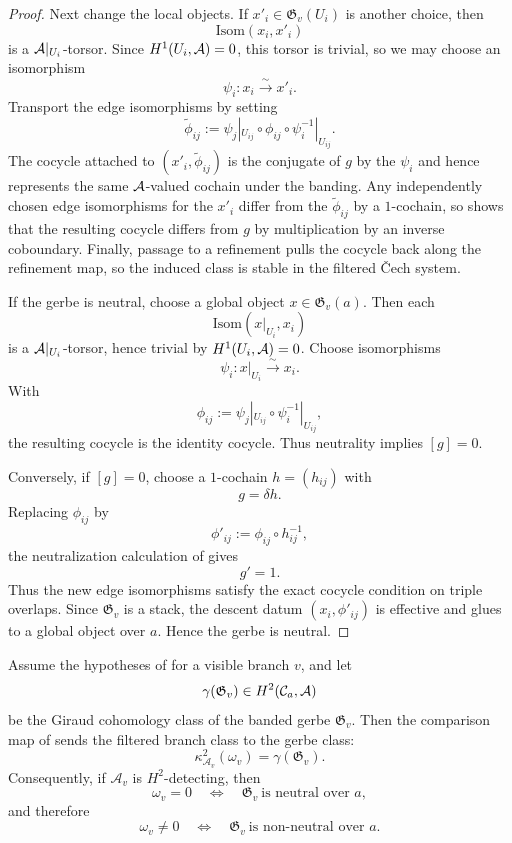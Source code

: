 \begin{proof}
Next change the local objects. If $x'_i\in \mathfrak G_v(U_i)$ is another choice, then
\[
\mathrm{Isom}(x_i,x'_i)
\]
is a $\mathcal{A}|_{U_i}$-torsor. Since $H^1(U_i,\mathcal{A})=0$, this torsor is trivial, so we may choose an isomorphism
\[
\psi_i:x_i\xrightarrow{\sim} x'_i.
\]
Transport the edge isomorphisms by setting
\[
\widetilde\phi_{ij}:=\psi_j|_{U_{ij}}\circ \phi_{ij}\circ \psi_i^{-1}|_{U_{ij}}.
\]
The cocycle attached to $(x'_i,\widetilde\phi_{ij})$ is the conjugate of $g$ by the $\psi_i$ and hence represents the same $\mathcal{A}$-valued cochain under the banding. Any independently chosen edge isomorphisms for the $x'_i$ differ from the $\widetilde\phi_{ij}$ by a $1$-cochain, so  shows that the resulting cocycle differs from $g$ by multiplication by an inverse coboundary. Finally, passage to a refinement pulls the cocycle back along the refinement map, so the induced class is stable in the filtered \v{C}ech system.

If the gerbe is neutral, choose a global object $x\in \mathfrak G_v(a)$. Then each
\[
\mathrm{Isom}(x|_{U_i},x_i)
\]
is a $\mathcal{A}|_{U_i}$-torsor, hence trivial by $H^1(U_i,\mathcal{A})=0$. Choose isomorphisms
\[
\psi_i:x|_{U_i}\xrightarrow{\sim} x_i.
\]
With
\[
\phi_{ij}:=\psi_j|_{U_{ij}}\circ \psi_i^{-1}|_{U_{ij}},
\]
the resulting cocycle is the identity cocycle. Thus neutrality implies $[g]=0$.

Conversely, if $[g]=0$, choose a $1$-cochain $h=(h_{ij})$ with
\[
g=\delta h.
\]
Replacing $\phi_{ij}$ by
\[
\phi'_{ij}:=\phi_{ij}\circ h_{ij}^{-1},
\]
the neutralization calculation of
 gives
\[
g'=1.
\]
Thus the new edge isomorphisms satisfy the exact cocycle condition on triple
overlaps. Since $\mathfrak G_v$ is a stack, the descent datum
$(x_i,\phi'_{ij})$ is effective and glues to a global object over $a$. Hence the
gerbe is neutral.
\end{proof}

\begin{proposition}\label{prop:cech-comparison-detects-nonneutrality}
Assume the hypotheses of  for a visible
branch $v$, and let
\[
\gamma(\mathfrak G_v)\in H^2(\mathcal C_a,\mathcal{A})
\]
be the Giraud cohomology class of the banded gerbe $\mathfrak G_v$. Then the
comparison map of  sends the filtered
branch class to the gerbe class:
\[
\kappa^2_{\mathcal A_v}(\omega_v)=\gamma(\mathfrak G_v).
\]
Consequently, if $\mathcal A_v$ is $H^2$-detecting, then
\[
\omega_v=0
\quad\Longleftrightarrow\quad
\mathfrak G_v\ \text{is neutral over }a,
\]
and therefore
\[
\omega_v\neq 0
\quad\Longleftrightarrow\quad
\mathfrak G_v\ \text{is non-neutral over }a.
\]
\end{proposition}

